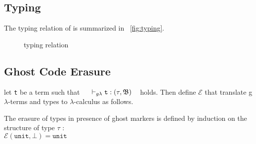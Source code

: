 \subsection{Typing}
The typing relation of \glam is summarized in ~\autoref{fig:typing}.
\begin{figure}[!h]
%	
	 \vspace*{0.4cm}
	
	\vspace*{0.4cm}
	
	\vspace*{0.4cm}
	
										{}\vspace*{0.4cm}
										
	{}
										
\caption{ \textbf{\glam  } typing relation \hfill}
\label{fig:typing}
\end{figure}


\subsection{Ghost Code Erasure}
\newcommand{\e}{\mathcal{E}}
let \texttt{t} be a term such that ~~ $\vdash_{g\lambda} \texttt{t} : (\tau, \mathfrak{B})$ ~ holds. Then define  $\e$ that translate g$\lambda$-terms and types to $\lambda$-calculus as follows. 

The erasure of types in presence of ghost markers 
is defined by induction on the structure of 
type $\tau$ : \\

$ \e(\texttt{unit}, \bot) = \texttt{unit}$ 

